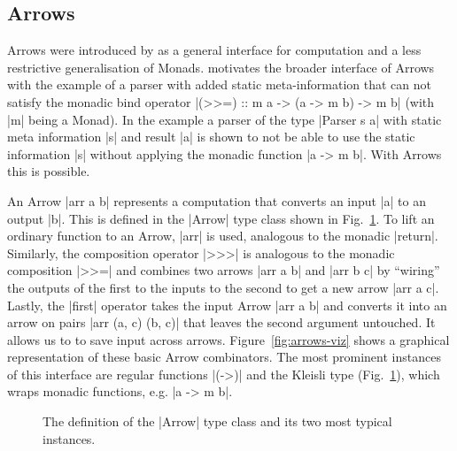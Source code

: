 \subsection{Arrows}
\label{sec:arrows}
Arrows were introduced by \citet{HughesArrows} as a general interface for computation and a less restrictive generalisation of Monads. \citeauthor{HughesArrows} motivates the broader interface of Arrows with the example of a parser with added static meta-information that can not satisfy the monadic bind operator |(>>=) :: m a -> (a -> m b) -> m b| (with |m| being a Monad). In the example a parser of the type |Parser s a| with static meta information |s| and result |a| is shown to not be able to use the static information |s| without applying the monadic function |a -> m b|. With Arrows this is possible.

An Arrow |arr a b| represents a computation that converts an input |a| to an output |b|. This is defined in the |Arrow| type class shown in Fig.~\ref{fig:ArrowDefinition}.
%
To lift an ordinary function to an Arrow, |arr| is used, analogous to the monadic |return|. Similarly, the composition operator |>>>| is analogous to the monadic composition |>>=| and combines two arrows |arr a b| and |arr b c| by \enquote{wiring} the outputs of the first to the inputs to the second to get a new arrow |arr a c|. Lastly, the |first| operator takes the input Arrow |arr a b| and converts it into an arrow on pairs |arr (a, c) (b, c)| that leaves the second argument untouched. It allows us to to save input across arrows. Figure~\ref{fig:arrows-viz} shows a graphical representation of these basic Arrow combinators.
The most prominent instances of this interface are regular functions |(->)|
and the Kleisli type (Fig.~\ref{fig:ArrowDefinition}), which wraps monadic functions, e.g.  |a -> m b|.

\begin{figure}[t]
\centering
{}
\vfill
\caption{The definition of the |Arrow| type class and its two most typical instances.}
\label{fig:ArrowDefinition}
\end{figure}

